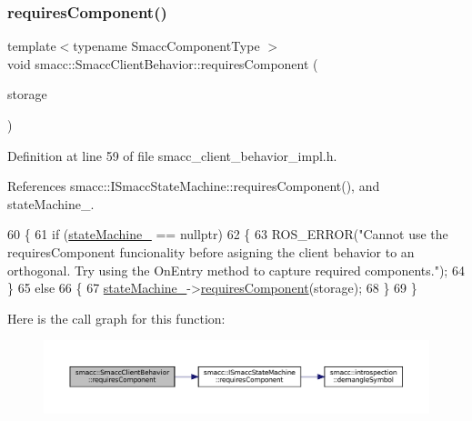 \mbox{\label{classsmacc_1_1SmaccClientBehavior_adee6abe3a28aa6b47d3dd5267e264b4d}} 
\subsubsection{\texorpdfstring{requires\+Component()}{requiresComponent()}}
{\footnotesize\ttfamily template$<$typename Smacc\+Component\+Type $>$ \\
void smacc\+::\+Smacc\+Client\+Behavior\+::requires\+Component (\begin{DoxyParamCaption}\item[{Smacc\+Component\+Type $\ast$\&}]{storage }\end{DoxyParamCaption})}



Definition at line 59 of file smacc\+\_\+client\+\_\+behavior\+\_\+impl.\+h.



References smacc\+::\+I\+Smacc\+State\+Machine\+::requires\+Component(), and state\+Machine\+\_\+.


\begin{DoxyCode}
60 \{
61     \textcolor{keywordflow}{if} (\hyperlink{classsmacc_1_1SmaccClientBehavior_a7950b5684d6de0a8e8959c0936ce9a19}{stateMachine\_} == \textcolor{keyword}{nullptr})
62     \{
63         ROS\_ERROR(\textcolor{stringliteral}{"Cannot use the requiresComponent funcionality before asigning the client behavior to an
       orthogonal. Try using the OnEntry method to capture required components."});
64     \}
65     \textcolor{keywordflow}{else}
66     \{
67         \hyperlink{classsmacc_1_1SmaccClientBehavior_a7950b5684d6de0a8e8959c0936ce9a19}{stateMachine\_}->\hyperlink{classsmacc_1_1ISmaccStateMachine_aa6b25e28f3bce24c4b356dc865a9eb7b}{requiresComponent}(storage);
68     \}
69 \}
\end{DoxyCode}
Here is the call graph for this function\+:
\nopagebreak
\begin{figure}[H]
\begin{center}
\leavevmode
\includegraphics[width=350pt]{classsmacc_1_1SmaccClientBehavior_adee6abe3a28aa6b47d3dd5267e264b4d_cgraph}
\end{center}
\end{figure}
\mbox{\label{classsmacc_1_1SmaccClientBehavior_a228b90d814511a24907c5d65553bcba2}} 

